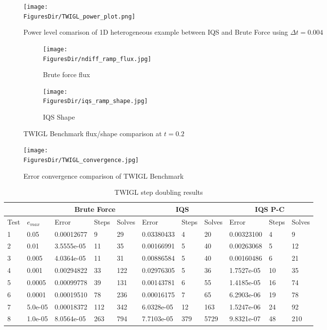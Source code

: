 \documentclass[12pt]{scrartcl}
\newcommand{\FiguresDir}{./figs}
\begin{document}
\begin{figure}[!htbp]
\centering
\texttt{[image: \\FiguresDir/TWIGL\_power\_plot.png]}
\caption{Power level comarison of 1D heterogeneous example between IQS and Brute Force using $\Delta t = 0.004$}
\label{fig:TWIGL_power}
\end{figure}

\begin{figure}[!htbp]
\begin{center}
\begin{subfigure}[!htbp]{0.4\textwidth}
\texttt{[image: \\FiguresDir/ndiff\_ramp\_flux.jpg]}
\caption{Brute force flux}
\end{subfigure}
\quad
\begin{subfigure}[!htbp]{0.4\textwidth}
\texttt{[image: \\FiguresDir/iqs\_ramp\_shape.jpg]}
\caption{IQS Shape}
\end{subfigure}
\caption{TWIGL Benchmark flux/shape comparison at $t=0.2$}
\label{fig:TWIGL_plots}
\end{center}
\end{figure}

\begin{figure}[!htbp]
\centering
\texttt{[image: \\FiguresDir/TWIGL\_convergence.jpg]}
\caption{Error convergence comparison of TWIGL Benchmark}
\label{fig:TWIGL_conv}
\end{figure}

\begin{table}[!htbp]
\begin{center}
\caption{TWIGL step doubling results}
\label{tab:TWIGLdt2}
\begin{tabular}{|l|l|l|l|l|l|l|l|l|l|l|}
\hline
  &  & \multicolumn{3}{|c|}{Brute Force} & \multicolumn{3}{|c|}{IQS} & \multicolumn{3}{|c|}{IQS P-C} \\
\hline
Test & $e_{max}$ & Error & Steps & Solves & Error & Steps & Solves & Error & Steps & Solves \\
\hline
1 &	0.05    &	0.00012677 &	9   &	29  &	0.03380433 &	4   &	20   &	0.00323100 &	4  &	9   \\
2 &	0.01    &	3.5555e-05 &	11  &	35  &	0.00166991 &	5   &	40   &	0.00263068 &	5  &	12  \\
3 &	0.005   &	4.0364e-05 &	11  &	31  &	0.00886584 &	5   &	40   &	0.00160486 &	6  &	21  \\
4 &	0.001   &	0.00294822 &	33  &	122 &	0.02976305 &	5   &	36   &	1.7527e-05 &	10 &	35  \\
5 &	0.0005  &	0.00099778 &	39  &	131 &	0.00143781 &	6   &	55   &	1.4185e-05 &	16 &	74  \\
6 &	0.0001  &	0.00019510 &	78  &	236 &	0.00016175 &	7   &	65   &	6.2903e-06 &	19 &	78  \\
7 &	5.0e-05 &	0.00018372 &	112 &	342 &	6.0328e-05 &	12  &	163  &	1.5247e-06 &	24 &	92  \\
8 &	1.0e-05 &	8.0564e-05 &	263 &	794 &	7.7103e-05 &	379 &	5729 &	9.8321e-07 &	48 &	210 \\
\hline

\end{tabular}
\end{center}
\end{table}
\end{document}
